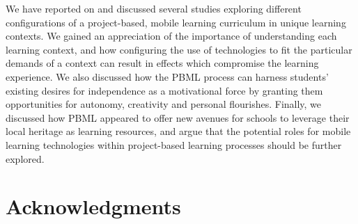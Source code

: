 \documentclass[,hyphens]{sigchi}
\begin{document}
We have reported on and discussed several studies exploring different configurations of a project-based, mobile learning curriculum in unique learning contexts. We gained an appreciation of the importance of understanding each learning context, and how configuring the use of technologies to fit the particular demands of a context can result in effects which compromise the learning experience. We also discussed how the PBML process can harness students' existing desires for independence as a motivational force by granting them opportunities for autonomy, creativity and personal flourishes. Finally, we discussed how PBML appeared to offer new avenues for schools to leverage their local heritage as learning resources, and argue that the potential roles for mobile learning technologies within project-based learning processes should be further explored.

\section{Acknowledgments}

\balance{}



\end{document}
